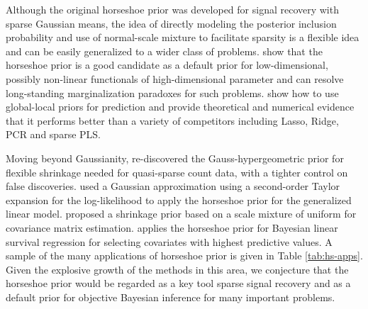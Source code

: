 \documentclass[11pt]{article}
\begin{document}
Although the original horseshoe prior was developed for signal recovery with
sparse Gaussian means, the idea of directly modeling the posterior inclusion
probability and use of normal-scale mixture to facilitate sparsity is a
flexible idea and can be easily generalized to a wider class of problems.
\citet{bhadra2015default} show that the horseshoe prior is a good candidate as
a default prior for low-dimensional, possibly non-linear functionals of
high-dimensional parameter and can resolve long-standing marginalization
paradoxes for such problems. \citet{bhadra2016prediction} show how to use
global-local priors for prediction and provide theoretical and numerical
evidence that it performs better than a variety of competitors including Lasso,
Ridge, PCR and sparse PLS. 

Moving beyond Gaussianity, \citet{datta2016bayesian} re-discovered the
Gauss-hypergeometric prior for flexible shrinkage needed for quasi-sparse count
data, with a tighter control on false discoveries.
\citet{piironen2016hyperprior} used a Gaussian approximation using a
second-order Taylor expansion for the log-likelihood to apply the horseshoe
prior for the generalized linear model. \citet{wang2013class} proposed a
shrinkage prior based on a scale mixture of uniform for covariance matrix
estimation. \citet{peltola2014hierarchical} applies the horseshoe prior for
Bayesian linear survival regression for selecting covariates with highest
predictive values. A sample of the many applications of horseshoe prior is
given in Table \ref{tab:hs-apps}. Given the explosive growth of the methods in
this area, we conjecture that the horseshoe prior would be regarded as a key
tool sparse signal recovery and as a default prior for objective Bayesian
inference for many important problems. 
\end{document}

